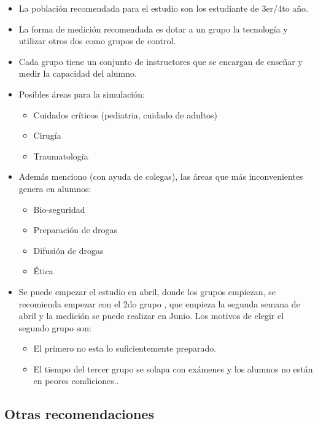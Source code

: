 \begin{itemize}
\itemsep1pt\parskip0pt
\item
  La población recomendada para el estudio son los estudiante de 3er/4to
  año.
\item
  La forma de medición recomendada es dotar a un grupo la tecnología y
  utilizar otros dos como grupos de control.
\item
  Cada grupo tiene un conjunto de instructores que se encargan de
  enseñar y medir la capacidad del alumno.
\item
  Posibles áreas para la simulación:

  \begin{itemize}
  \itemsep1pt\parskip0pt
  \item
    Cuidados críticos (pediatria, cuidado de adultos)
  \item
    Cirugía
  \item
    Traumatologia
  \end{itemize}
\item
  Además menciono (con ayuda de colegas), las áreas que más
  inconvenientes genera en alumnos:

  \begin{itemize}
  \itemsep1pt\parskip0pt
  \item
    Bio-seguridad
  \item
    Preparación de drogas
  \item
    Difusión de drogas
  \item
    Ética
  \end{itemize}
\item
  Se puede empezar el estudio en abril, donde los grupos empiezan, se
  recomienda empezar con el 2do grupo , que empieza la segunda semana de
  abril y la medición se puede realizar en Junio. Los motivos de elegir
  el segundo grupo son:

  \begin{itemize}
  \itemsep1pt\parskip0pt
  \item
    El primero no esta lo suficientemente preparado.
  \item
    El tiempo del tercer grupo se solapa con exámenes y los alumnos no
    están en peores condiciones..
  \end{itemize}
\end{itemize}

\subsection{Otras recomendaciones}\label{otras-recomendaciones}

